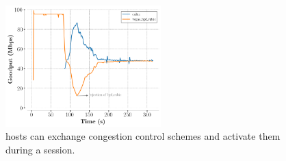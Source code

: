 \begin{figure}[!t]
  \begin{center}
    \includegraphics[width=6cm]{pretty_plotify/plots/vegas_cubic.png}
  \end{center}
  \caption{\tcpls hosts can exchange congestion control schemes and activate them during a \tcpls session.}
  \label{fig:vegasCubic}
\end{figure}
